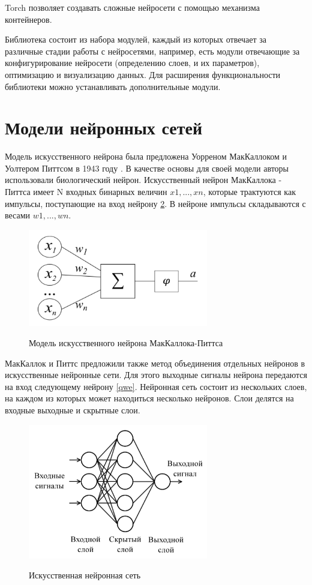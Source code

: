 Torch позволяет создавать сложные нейросети с помощью механизма контейнеров.

Библиотека состоит из набора модулей, каждый из которых отвечает за различные стадии работы с нейросетями, например, есть модули отвечающие за конфигурирование нейросети (определению слоев, и их параметров), оптимизацию и визуализацию данных. Для расширения функциональности библиотеки можно устанавливать дополнительные модули.






\section{Модели нейронных сетей}

Модель искусственного нейрона была предложена Уорреном МакКаллоком и Уолтером Питтсом в 1943 году \cite{McCulloch} . В качестве основы для своей модели авторы использовали биологический нейрон. Искусственный нейрон МакКаллока - Питтса имеет N входных бинарных величин $x1, ..., xn$, которые трактуются как импульсы, поступающие на вход нейрону \ref{net}. В нейроне импульсы складываются с весами $w1, ..., wn$.
\begin{figure}[htbp]
\centering
\caption{Модель искусственного нейрона МакКаллока-Питтса}
\includegraphics[width=0.7\textwidth]{fig/net}
\label{net}
\end{figure}


МакКаллок и Питтс предложили также метод объединения отдельных нейронов в
искусственные нейронные сети. Для этого выходные сигналы нейрона передаются на вход следующему нейрону \ref{qwe}. Нейронная сеть состоит из нескольких слоев, на каждом из которых может находиться несколько нейронов. Слои делятся на входные выходные и скрытные слои.
\begin{figure}[htbp]
\centering
\caption{Искусственная нейронная сеть}
\includegraphics[width=0.7\textwidth]{fig/qwe}
\label{net}
\end{figure}

